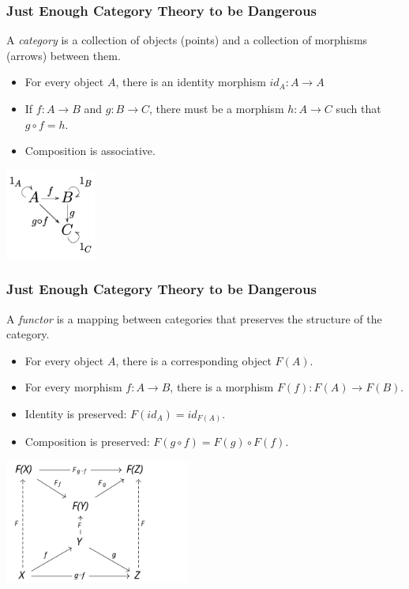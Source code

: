 \documentclass[
  aspectratio=1610, 
  xcolor={dvipsnames},
]{beamer}
\begin{document}
\begin{frame}
  \frametitle{Just Enough Category Theory to be Dangerous}

  A \emph{category} is a collection of objects (points) and a collection of
  morphisms (arrows) between them. 

  \begin{itemize}
    \item For every object \(A\), there is an identity morphism \(id_A: A \to A\)
    \item If \(f: A \to B\) and \(g: B \to C\), there must be a morphism \(h: A
    \to C\) such that \(g \circ f = h\).
    \item Composition is associative.
  \end{itemize}

  \begin{center}
    \includegraphics[height = 8em]{fig/cat.png}
  \end{center}

\end{frame}

\begin{frame}
  \frametitle{Just Enough Category Theory to be Dangerous}

  A \emph{functor} is a mapping between categories that preserves the structure
  of the category.
  
  \begin{itemize}
    \item For every object \(A\), there is a corresponding object \(F(A)\).
    \item For every morphism \(f: A \to B\), there is a morphism \(F(f): F(A)
    \to F(B)\).
    \item Identity is preserved: \(F(id_A) = id_{F(A)}\).
    \item Composition is preserved: \(F(g \circ f) = F(g) \circ F(f)\).
  \end{itemize}
  
  \begin{center}
    \includegraphics[height = 11em]{fig/fun.png}
  \end{center}

\end{frame}
\end{document}
